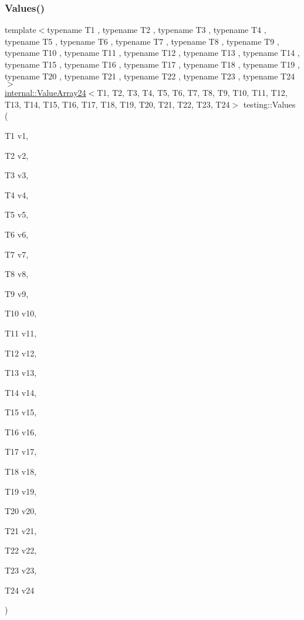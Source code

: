 \subsubsection{\texorpdfstring{Values()}{Values()}\hspace{0.1cm}{\footnotesize\ttfamily [24/50]}}
{\footnotesize\ttfamily template$<$typename T1 , typename T2 , typename T3 , typename T4 , typename T5 , typename T6 , typename T7 , typename T8 , typename T9 , typename T10 , typename T11 , typename T12 , typename T13 , typename T14 , typename T15 , typename T16 , typename T17 , typename T18 , typename T19 , typename T20 , typename T21 , typename T22 , typename T23 , typename T24 $>$ \\
\mbox{\hyperlink{classtesting_1_1internal_1_1ValueArray24}{internal\+::\+Value\+Array24}}$<$T1, T2, T3, T4, T5, T6, T7, T8, T9, T10, T11, T12, T13, T14, T15, T16, T17, T18, T19, T20, T21, T22, T23, T24$>$ testing\+::\+Values (\begin{DoxyParamCaption}\item[{T1}]{v1,  }\item[{T2}]{v2,  }\item[{T3}]{v3,  }\item[{T4}]{v4,  }\item[{T5}]{v5,  }\item[{T6}]{v6,  }\item[{T7}]{v7,  }\item[{T8}]{v8,  }\item[{T9}]{v9,  }\item[{T10}]{v10,  }\item[{T11}]{v11,  }\item[{T12}]{v12,  }\item[{T13}]{v13,  }\item[{T14}]{v14,  }\item[{T15}]{v15,  }\item[{T16}]{v16,  }\item[{T17}]{v17,  }\item[{T18}]{v18,  }\item[{T19}]{v19,  }\item[{T20}]{v20,  }\item[{T21}]{v21,  }\item[{T22}]{v22,  }\item[{T23}]{v23,  }\item[{T24}]{v24 }\end{DoxyParamCaption})}

\mbox{\label{namespacetesting_a74baf6524bda9b5799e313541b4816ea}} 

